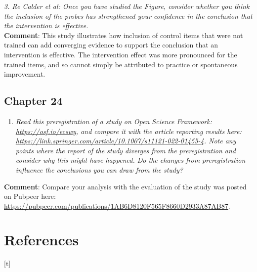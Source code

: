 \documentclass{krantz}
\providecommand{\tightlist}{%
\setlength{\itemsep}{0pt}\setlength{\parskip}{0pt}}
\begin{document}
\emph{3. Re Calder et al: Once you have studied the Figure, consider whether you think the inclusion of the probes has strengthened your confidence in the conclusion that the intervention is effective.}\\
\textbf{Comment}: This study illustrates how inclusion of control items that were not trained can add converging evidence to support the conclusion that an intervention is effective. The intervention effect was more pronounced for the trained items, and so cannot simply be attributed to practice or spontaneous improvement.

\hypertarget{chapter-24}{%
\subsection{Chapter 24}\label{chapter-24}}

\begin{enumerate}
\def\labelenumi{\arabic{enumi}.}
\tightlist
\item
  \emph{Read this preregistration of a study on Open Science Framework: \url{https://osf.io/ecswy}, and compare it with the article reporting results here: \url{https://link.springer.com/article/10.1007/s11121-022-01455-4}. Note any points where the report of the study diverges from the preregistration and consider why this might have happened. Do the changes from preregistration influence the conclusions you can draw from the study?}
\end{enumerate}

\textbf{Comment}: Compare your analysis with the evaluation of the study was posted on Pubpeer here: \url{https://pubpeer.com/publications/1AB6D8120F565F8660D2933A87AB87}.

\hypertarget{references}{%
\section{References}\label{references}}[t]
\end{document}
